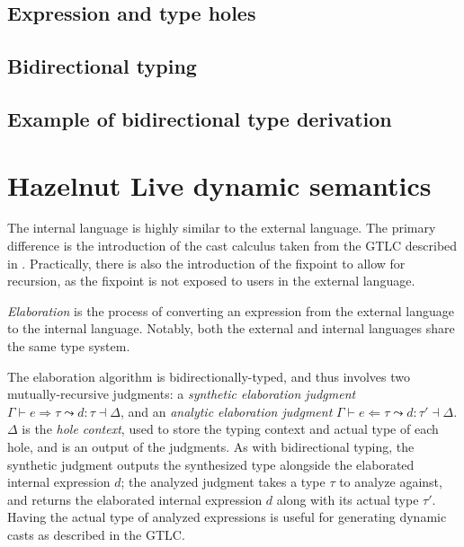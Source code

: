 \subsection{Expression and type holes}
\label{sec:holes}

\subsection{Bidirectional typing}
\label{sec:bidirectional_typing}

\subsection{Example of bidirectional type derivation}
\label{sec:typing_example}

\section{Hazelnut Live dynamic semantics}
\label{sec:dynamics}


The internal language is highly similar to the external language. The primary difference is the introduction of the cast calculus taken from the GTLC described in . Practically, there is also the introduction of the fixpoint to allow for recursion, as the fixpoint is not exposed to users in the external language.

\textit{Elaboration} is the process of converting an expression from the external language to the internal language. Notably, both the external and internal languages share the same type system.

The elaboration algorithm is bidirectionally-typed, and thus involves two mutually-recursive judgments: a \textit{synthetic elaboration judgment} $\Gamma\vdash e\Rightarrow\tau\leadsto d:\tau\dashv\Delta$, and an \textit{analytic elaboration judgment} $\Gamma\vdash e\Leftarrow\tau\leadsto d:\tau'\dashv\Delta$. $\Delta$ is the \textit{hole context}, used to store the typing context and actual type of each hole, and is an output of the judgments. As with bidirectional typing, the synthetic judgment outputs the synthesized type alongside the elaborated internal expression $d$; the analyzed judgment takes a type $\tau$ to analyze against, and returns the elaborated internal expression $d$ along with its actual type $\tau'$. Having the actual type of analyzed expressions is useful for generating dynamic casts as described in the GTLC.

